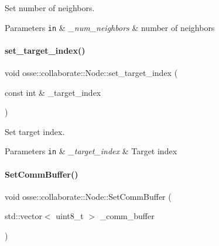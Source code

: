 Set number of neighbors. 


\begin{DoxyParams}[1]{Parameters}
\mbox{\tt in}  & {\em \+\_\+num\+\_\+neighbors} & number of neighbors \\
\hline
\end{DoxyParams}
\mbox{\label{classosse_1_1collaborate_1_1_node_a615007d2ca37dfb904d0889618ed792b}} 
\paragraph{\texorpdfstring{set\+\_\+target\+\_\+index()}{set\_target\_index()}}
{\footnotesize\ttfamily void osse\+::collaborate\+::\+Node\+::set\+\_\+target\+\_\+index (\begin{DoxyParamCaption}\item[{const int \&}]{\+\_\+target\+\_\+index }\end{DoxyParamCaption})\hspace{0.3cm}{\ttfamily [inline]}}



Set target index. 


\begin{DoxyParams}[1]{Parameters}
\mbox{\tt in}  & {\em \+\_\+target\+\_\+index} & Target index \\
\hline
\end{DoxyParams}
\mbox{\label{classosse_1_1collaborate_1_1_node_a222b22c38f2d5c317de945d798a76955}} 
\paragraph{\texorpdfstring{Set\+Comm\+Buffer()}{SetCommBuffer()}}
{\footnotesize\ttfamily void osse\+::collaborate\+::\+Node\+::\+Set\+Comm\+Buffer (\begin{DoxyParamCaption}\item[{std\+::vector$<$ uint8\+\_\+t $>$}]{\+\_\+comm\+\_\+buffer }\end{DoxyParamCaption})}



